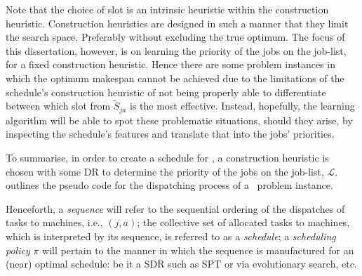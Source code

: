 Note that the choice of slot is an intrinsic heuristic within the construction heuristic.
Construction heuristics are designed in such a manner that they limit the 
search space. Preferably without excluding the true optimum. The focus of this 
dissertation, however, is on learning the priority of the jobs on the job-list, 
for a fixed construction heuristic. Hence there are some problem instances in 
which the optimum makespan cannot be achieved due to the limitations of the 
schedule's construction heuristic of not being properly able to differentiate 
between which slot from $\tilde{S}_{ja}$ is the most effective. Instead, 
hopefully, the learning algorithm will be able to spot these problematic 
situations, should they arise, by inspecting the schedule's features and 
translate that into the jobs' priorities.

To summarise, in order to create a schedule for \JSP, a construction heuristic 
is chosen with some DR to determine the priority of the jobs on the job-list, 
$\mathcal{L}$. 
 outlines the pseudo code for the 
dispatching process of a \JSP\ problem instance.



Henceforth, a \emph{sequence} will refer to the sequential ordering of the 
dispatches of tasks to machines, i.e., $(j,a)$; the collective set of allocated 
tasks to machines, which is interpreted by its sequence, is referred to as a 
\emph{schedule}; a \emph{scheduling policy} $\pi$ will pertain to the manner in 
which the sequence is manufactured for an (near) optimal schedule: be it a SDR 
such as SPT or via evolutionary search, etc. 

